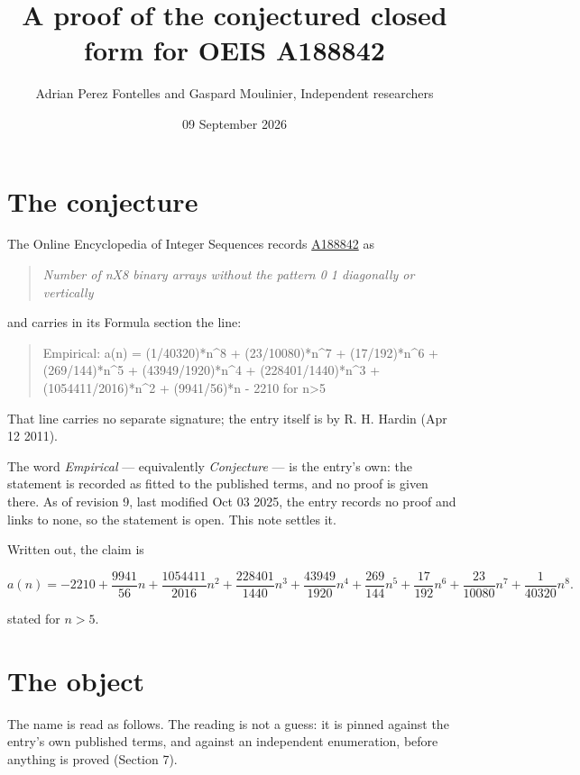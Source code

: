 \documentclass[11pt]{article}
\title{A proof of the conjectured closed form for OEIS A188842}
\author{Adrian Perez Fontelles and Gaspard Moulinier, Independent researchers}
\date{09 September 2026}
\theoremstyle{definition}
\begin{document}
\maketitle
\section{The conjecture}

The Online Encyclopedia of Integer Sequences records \href{https://oeis.org/A188842}{A188842} as

\begin{quote}\itshape Number of nX8 binary arrays without the pattern 0 1 diagonally or vertically\end{quote}

and carries in its Formula section the line:

\begin{quote}\ttfamily Empirical: a(n) = (1/40320)*n\textasciicircum{}8 + (23/10080)*n\textasciicircum{}7 + (17/192)*n\textasciicircum{}6 + (269/144)*n\textasciicircum{}5 + (43949/1920)*n\textasciicircum{}4 + (228401/1440)*n\textasciicircum{}3 + (1054411/2016)*n\textasciicircum{}2 + (9941/56)*n - 2210 for n>5\end{quote}

That line carries no separate signature; the entry itself is by R. H. Hardin (Apr 12 2011).

The word {\itshape Empirical} --- equivalently {\itshape Conjecture} --- is the entry's own: the statement is recorded as fitted to the published terms, and no proof is given there. As of revision 9, last modified Oct 03 2025, the entry records no proof and links to none, so the statement is open. This note settles it.

Written out, the claim is

\[a(n) = -2210 + \frac{9941}{56}n + \frac{1054411}{2016}n^{2} + \frac{228401}{1440}n^{3} + \frac{43949}{1920}n^{4} + \frac{269}{144}n^{5} + \frac{17}{192}n^{6} + \frac{23}{10080}n^{7} + \frac{1}{40320}n^{8}.\]

stated for $n > 5$.

\section{The object}

The name is read as follows. The reading is not a guess: it is pinned against the entry's own published terms, and against an independent enumeration, before anything is proved (Section 7).
\end{document}
